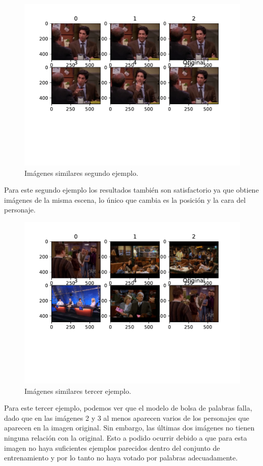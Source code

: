 	\begin{figure}[H]
		\centering
		\includegraphics[scale=0.6]{./imagenes/eje3_2.pdf}
		\caption{Imágenes similares segundo ejemplo.}
		\label{fig:eje3_2}
	\end{figure}
	
	\vspace{0.06in}
	Para este segundo ejemplo los resultados también son satisfactorio ya que obtiene imágenes de la misma escena, lo único que cambia es la posición y la cara del personaje.

	\begin{figure}[H]
		\centering
		\includegraphics[scale=0.6]{./imagenes/eje3_3.pdf}
		\caption{Imágenes similares tercer ejemplo.}
		\label{fig:eje3_3}
	\end{figure}

	\vspace{0.06in}
	Para este tercer ejemplo, podemos ver que el modelo de bolsa de palabras falla, dado que en las imágenes 2 y 3 al menos aparecen varios de los personajes que aparecen en la imagen original. Sin embargo,  las últimas dos imágenes no tienen ninguna relación con la original. Esto a podido ocurrir debido a que para esta imagen no haya suficientes ejemplos parecidos dentro del conjunto de entrenamiento y por lo tanto no haya votado por palabras adecuadamente.
	
